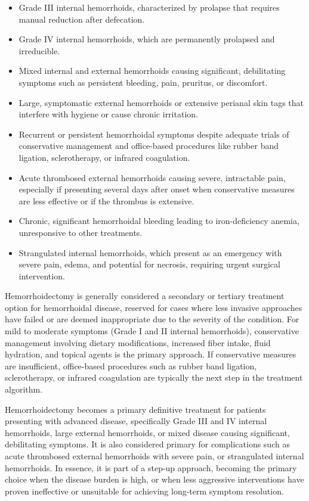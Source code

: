 \begin{itemize}
  \item Grade III internal hemorrhoids, characterized by prolapse that requires manual reduction after defecation.
  \item Grade IV internal hemorrhoids, which are permanently prolapsed and irreducible.
  \item Mixed internal and external hemorrhoids causing significant, debilitating symptoms such as persistent bleeding, pain, pruritus, or discomfort.
  \item Large, symptomatic external hemorrhoids or extensive perianal skin tags that interfere with hygiene or cause chronic irritation.
  \item Recurrent or persistent hemorrhoidal symptoms despite adequate trials of conservative management and office-based procedures like rubber band ligation, sclerotherapy, or infrared coagulation.
  \item Acute thrombosed external hemorrhoids causing severe, intractable pain, especially if presenting several days after onset when conservative measures are less effective or if the thrombus is extensive.
  \item Chronic, significant hemorrhoidal bleeding leading to iron-deficiency anemia, unresponsive to other treatments.
  \item Strangulated internal hemorrhoids, which present as an emergency with severe pain, edema, and potential for necrosis, requiring urgent surgical intervention.
\end{itemize}

Hemorrhoidectomy is generally considered a secondary or tertiary treatment option for hemorrhoidal disease, reserved for cases where less invasive approaches have failed or are deemed inappropriate due to the severity of the condition. For mild to moderate symptoms (Grade I and II internal hemorrhoids), conservative management involving dietary modifications, increased fiber intake, fluid hydration, and topical agents is the primary approach. If conservative measures are insufficient, office-based procedures such as rubber band ligation, sclerotherapy, or infrared coagulation are typically the next step in the treatment algorithm.

Hemorrhoidectomy becomes a primary definitive treatment for patients presenting with advanced disease, specifically Grade III and IV internal hemorrhoids, large external hemorrhoids, or mixed disease causing significant, debilitating symptoms. It is also considered primary for complications such as acute thrombosed external hemorrhoids with severe pain, or strangulated internal hemorrhoids. In essence, it is part of a step-up approach, becoming the primary choice when the disease burden is high, or when less aggressive interventions have proven ineffective or unsuitable for achieving long-term symptom resolution.

